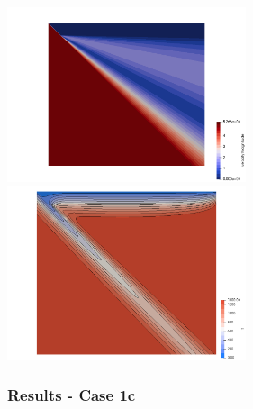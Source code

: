 \begin{center}
\includegraphics[width=7cm]{python_codes/fieldstone_68/results/case1b/vel_1b}
\includegraphics[width=7cm]{python_codes/fieldstone_68/results/case1b/T_1b}
\end{center}



\newpage
\subsubsection*{Results - Case 1c}

